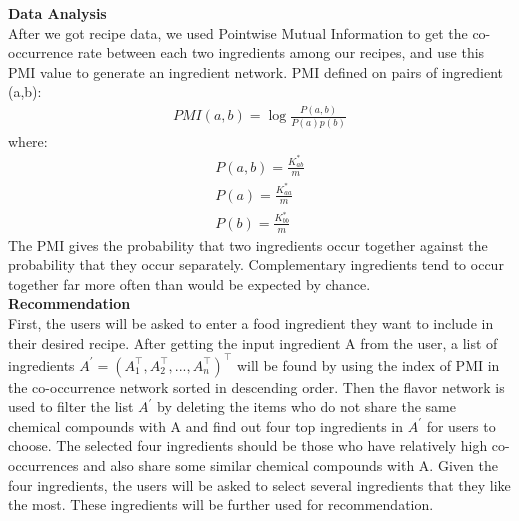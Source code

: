 \documentclass[sigconf]{acmart}
\begin{document}
\noindent
\textbf{Data Analysis}\\
After we got recipe data, we used Pointwise Mutual Information to get the co-occurrence rate between each two ingredients among our recipes, and use this PMI value to generate an ingredient network. PMI defined on pairs of ingredient (a,b):
\begin{align*}
PMI(a,b)=\log \frac{P(a,b)}{P(a)p(b)}
\end{align*}
where:
\begin{align*}
P(a,b)=\frac{K^*_{ab}}{m} \\
P(a)=\frac{K^*_{aa}}{m} \\
P(b)=\frac{K^*_{bb}}{m}
\end{align*}
The PMI gives the probability that two ingredients occur together against the probability that they occur separately. Complementary ingredients tend to occur together far more often than would be expected by chance.\cite{teng2012recipe}\\

\noindent
\textbf{Recommendation}\\
First, the users will be asked to enter a food ingredient they want to include in their desired recipe. After getting the input ingredient A from the user, a list of ingredients $A^\prime=(A_1^\top,A_2^\top,...,A_n^\top)^\top$ will be found by using the index of PMI in the co-occurrence network sorted in descending order. Then the flavor network is used to filter the list $A^\prime$ by deleting the items who do not share the same chemical compounds with A and find out four top ingredients in $A^\prime$ for users to choose. The selected four ingredients should be those who have relatively high co-occurrences and also share some similar chemical compounds with A. Given the four ingredients, the users will be asked to select several ingredients that they like the most. These ingredients will be further used for recommendation.\\
\end{document}
